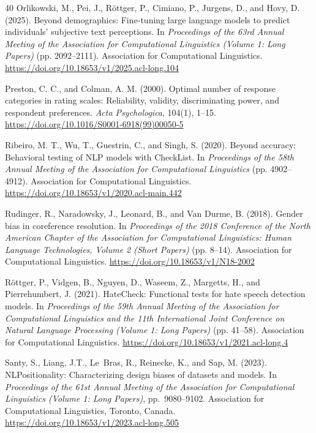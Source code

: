 \documentclass[a4paper,fleqn,review]{cas-sc}
\begin{document}
\begin{thebibliography}{40}
Orlikowski, M., Pei, J., R\"ottger, P., Cimiano, P., Jurgens, D., and Hovy, D. (2025).
Beyond demographics: Fine-tuning large language models to predict individuals' subjective text perceptions.
In \emph{Proceedings of the 63rd Annual Meeting of the Association for Computational Linguistics (Volume 1: Long Papers)} (pp. 2092--2111).
Association for Computational Linguistics.
\url{https://doi.org/10.18653/v1/2025.acl-long.104}

Preston, C. C., and Colman, A. M. (2000).
Optimal number of response categories in rating scales: Reliability, validity, discriminating power, and respondent preferences.
\emph{Acta Psychologica}, 104(1), 1--15.
\url{https://doi.org/10.1016/S0001-6918(99)00050-5}

Ribeiro, M. T., Wu, T., Guestrin, C., and Singh, S. (2020).
Beyond accuracy: Behavioral testing of NLP models with CheckList.
In \emph{Proceedings of the 58th Annual Meeting of the Association for Computational Linguistics} (pp. 4902--4912).
Association for Computational Linguistics.
\url{https://doi.org/10.18653/v1/2020.acl-main.442}

Rudinger, R., Naradowsky, J., Leonard, B., and Van Durme, B. (2018).
Gender bias in coreference resolution.
In \emph{Proceedings of the 2018 Conference of the North American Chapter of the Association for Computational Linguistics: Human Language Technologies, Volume 2 (Short Papers)} (pp. 8--14).
Association for Computational Linguistics.
\url{https://doi.org/10.18653/v1/N18-2002}

R\"ottger, P., Vidgen, B., Nguyen, D., Waseem, Z., Margetts, H., and Pierrehumbert, J. (2021).
HateCheck: Functional tests for hate speech detection models.
In \emph{Proceedings of the 59th Annual Meeting of the Association for Computational Linguistics and the 11th International Joint Conference on Natural Language Processing (Volume 1: Long Papers)} (pp. 41--58).
Association for Computational Linguistics.
\url{https://doi.org/10.18653/v1/2021.acl-long.4}

Santy, S., Liang, J.T., Le~Bras, R., Reinecke, K., and Sap, M. (2023).
NLPositionality: Characterizing design biases of datasets and models.
In \emph{Proceedings of the 61st Annual Meeting of the Association for Computational Linguistics (Volume 1: Long Papers)}, pp.~9080--9102. Association for Computational Linguistics, Toronto, Canada.
\url{https://doi.org/10.18653/v1/2023.acl-long.505}


\end{thebibliography}
\end{document}
